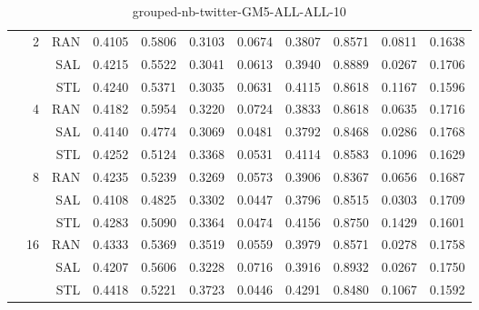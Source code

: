 \begin{center}
\begin{table}[htbp]
\begin{tabular}{ | r | r | r | r | r | r | r | r | r | r | r |}
 & \multirow{3}{*}{2} & RAN & 0.4105 & 0.5806 & 0.3103 & 0.0674 & 0.3807 & 0.8571 & 0.0811 & 0.1638\\ \cline{3-11}
 &   & SAL & 0.4215 & 0.5522 & 0.3041 & 0.0613 & 0.3940 & 0.8889 & 0.0267 & 0.1706\\ \cline{3-11}
 &   & STL & 0.4240 & 0.5371 & 0.3035 & 0.0631 & 0.4115 & 0.8618 & 0.1167 & 0.1596\\ \cline{2-11}
 & \multirow{3}{*}{4} & RAN & 0.4182 & 0.5954 & 0.3220 & 0.0724 & 0.3833 & 0.8618 & 0.0635 & 0.1716\\ \cline{3-11}
 &   & SAL & 0.4140 & 0.4774 & 0.3069 & 0.0481 & 0.3792 & 0.8468 & 0.0286 & 0.1768\\ \cline{3-11}
 &   & STL & 0.4252 & 0.5124 & 0.3368 & 0.0531 & 0.4114 & 0.8583 & 0.1096 & 0.1629\\ \cline{2-11}
 & \multirow{3}{*}{8} & RAN & 0.4235 & 0.5239 & 0.3269 & 0.0573 & 0.3906 & 0.8367 & 0.0656 & 0.1687\\ \cline{3-11}
 &   & SAL & 0.4108 & 0.4825 & 0.3302 & 0.0447 & 0.3796 & 0.8515 & 0.0303 & 0.1709\\ \cline{3-11}
 &   & STL & 0.4283 & 0.5090 & 0.3364 & 0.0474 & 0.4156 & 0.8750 & 0.1429 & 0.1601\\ \cline{2-11}
 & \multirow{3}{*}{16} & RAN & 0.4333 & 0.5369 & 0.3519 & 0.0559 & 0.3979 & 0.8571 & 0.0278 & 0.1758\\ \cline{3-11}
 &   & SAL & 0.4207 & 0.5606 & 0.3228 & 0.0716 & 0.3916 & 0.8932 & 0.0267 & 0.1750\\ \cline{3-11}
 &   & STL & 0.4418 & 0.5221 & 0.3723 & 0.0446 & 0.4291 & 0.8480 & 0.1067 & 0.1592\\ \cline{2-11}
\hline
\end{tabular}
\caption{grouped-nb-twitter-GM5-ALL-ALL-10}
\end{table}
\end{center}

